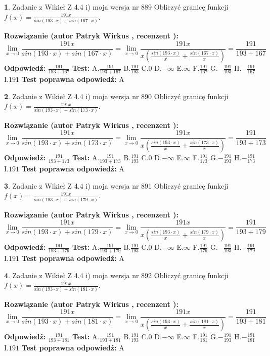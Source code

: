 \documentclass[12pt, a4paper]{article}
\theoremstyle{definition} %
\newtheorem{zad}{}
\newcommand{\zadStart}[1]{\begin{zad}#1\newline}
\newcommand{\zadStop}{\end{zad}}
\newcommand{\rozwStart}[2]{\noindent \textbf{Rozwiązanie (autor #1 , recenzent #2): }\newline}
\newcommand{\rozwStop}{\newline}
\newcommand{\odpStart}{\noindent \textbf{Odpowiedź:}\newline}
\newcommand{\odpStop}{\newline}
\newcommand{\testStart}{\noindent \textbf{Test:}\newline}
\newcommand{\testStop}{\newline}
\newcommand{\kluczStart}{\noindent \textbf{Test poprawna odpowiedź:}\newline}
\newcommand{\kluczStop}{\newline}
\begin{document}
\zadStart{Zadanie z Wikieł Z 4.4 i) moja wersja nr 889}
Obliczyć granicę funkcji $f(x)=\frac{191x}{sin(193\cdot x) +sin(167\cdot x)}$.
\zadStop
\rozwStart{Patryk Wirkus}{}
$$\lim\limits_{x\to 0}\frac{191x}{sin(193\cdot x) +sin(167\cdot x)}=\lim\limits_{x\to 0}\frac{191x}{x(\frac{sin(193\cdot x)}{x}+\frac{sin(167\cdot x)}{x})}=\frac{191}{193+167}$$
\rozwStop
\odpStart
$\frac{191}{193+167}$
\odpStop
\testStart
A.$\frac{191}{193+167}$
B.$\frac{191}{193}$
C.$0$
D.$-\infty$
E.$\infty$
F.$\frac{191}{167}$
G.$-\frac{191}{193}$
H.$-\frac{191}{167}$
I.$191$
\testStop
\kluczStart
A
\kluczStop



\zadStart{Zadanie z Wikieł Z 4.4 i) moja wersja nr 890}
Obliczyć granicę funkcji $f(x)=\frac{191x}{sin(193\cdot x) +sin(173\cdot x)}$.
\zadStop
\rozwStart{Patryk Wirkus}{}
$$\lim\limits_{x\to 0}\frac{191x}{sin(193\cdot x) +sin(173\cdot x)}=\lim\limits_{x\to 0}\frac{191x}{x(\frac{sin(193\cdot x)}{x}+\frac{sin(173\cdot x)}{x})}=\frac{191}{193+173}$$
\rozwStop
\odpStart
$\frac{191}{193+173}$
\odpStop
\testStart
A.$\frac{191}{193+173}$
B.$\frac{191}{193}$
C.$0$
D.$-\infty$
E.$\infty$
F.$\frac{191}{173}$
G.$-\frac{191}{193}$
H.$-\frac{191}{173}$
I.$191$
\testStop
\kluczStart
A
\kluczStop



\zadStart{Zadanie z Wikieł Z 4.4 i) moja wersja nr 891}
Obliczyć granicę funkcji $f(x)=\frac{191x}{sin(193\cdot x) +sin(179\cdot x)}$.
\zadStop
\rozwStart{Patryk Wirkus}{}
$$\lim\limits_{x\to 0}\frac{191x}{sin(193\cdot x) +sin(179\cdot x)}=\lim\limits_{x\to 0}\frac{191x}{x(\frac{sin(193\cdot x)}{x}+\frac{sin(179\cdot x)}{x})}=\frac{191}{193+179}$$
\rozwStop
\odpStart
$\frac{191}{193+179}$
\odpStop
\testStart
A.$\frac{191}{193+179}$
B.$\frac{191}{193}$
C.$0$
D.$-\infty$
E.$\infty$
F.$\frac{191}{179}$
G.$-\frac{191}{193}$
H.$-\frac{191}{179}$
I.$191$
\testStop
\kluczStart
A
\kluczStop



\zadStart{Zadanie z Wikieł Z 4.4 i) moja wersja nr 892}
Obliczyć granicę funkcji $f(x)=\frac{191x}{sin(193\cdot x) +sin(181\cdot x)}$.
\zadStop
\rozwStart{Patryk Wirkus}{}
$$\lim\limits_{x\to 0}\frac{191x}{sin(193\cdot x) +sin(181\cdot x)}=\lim\limits_{x\to 0}\frac{191x}{x(\frac{sin(193\cdot x)}{x}+\frac{sin(181\cdot x)}{x})}=\frac{191}{193+181}$$
\rozwStop
\odpStart
$\frac{191}{193+181}$
\odpStop
\testStart
A.$\frac{191}{193+181}$
B.$\frac{191}{193}$
C.$0$
D.$-\infty$
E.$\infty$
F.$\frac{191}{181}$
G.$-\frac{191}{193}$
H.$-\frac{191}{181}$
I.$191$
\testStop
\kluczStart
A
\kluczStop
\end{document}
